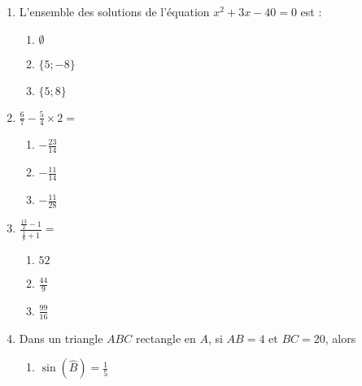 \documentclass[oneside,twoside]{book}
\begin{document}
\begin{enumerate}
\begin{enumerate}
\end{enumerate}




\item L'ensemble des solutions de l'équation $x^{2}+3 x-40=0$ est :

\begin{enumerate}

\item\MauvaiseReponse $\emptyset$

\item\BonneReponse $\{5 ;-8\}$

\item\MauvaiseReponse $\{5 ; 8\}$

\end{enumerate}



\item $\frac{6}{7} - \frac{5}{4} \times2=$

\begin{enumerate}

\item\BonneReponse $-\frac{23}{14}$

\item\MauvaiseReponse $-\frac{11}{14}$

\item\MauvaiseReponse $-\frac{11}{28}$


\end{enumerate}



\item $\displaystyle\frac{\frac{13}{2}-1}{\frac{1}{8}+1}=$

\begin{enumerate}


\item\MauvaiseReponse $52$

\item\BonneReponse $\frac{44}{9}$

\item\MauvaiseReponse $\frac{99}{16}$

\end{enumerate}




\item Dans un triangle $ABC$ rectangle en $A$, si $AB=4$ et $BC=20$, alors

\begin{enumerate}

\item\MauvaiseReponse $\sin (\hat{B})=\frac{1}{5}$



\end{enumerate}
\end{enumerate}
\end{document}
